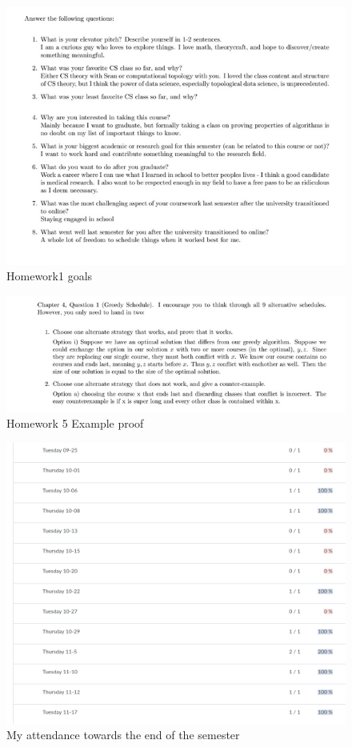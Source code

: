\documentclass{article}
\begin{document}
\begin{figure}

	\includegraphics[width=\textwidth]{algos1.png}
	\caption{Homework1 goals}

\end{figure}

\begin{figure}

	\includegraphics[width=\textwidth]{algos2.png}
	\caption{Homework 5 Example proof}

\end{figure}

\begin{figure}

	\includegraphics[width=\textwidth]{algos3.png}
	\caption{My attendance towards the end of the semester}


\end{figure}
\end{document}
